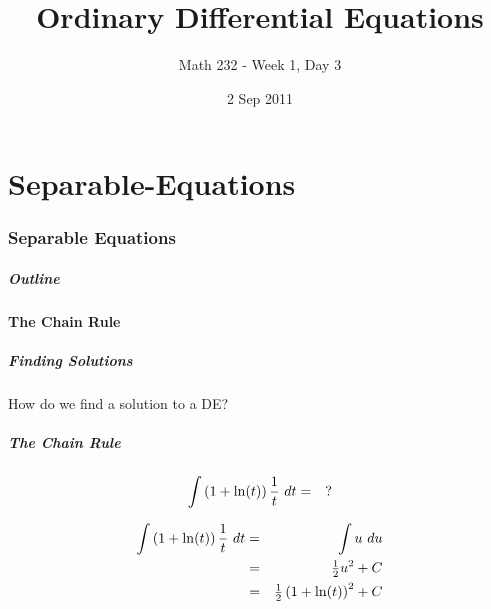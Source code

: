 \part{Separable-Equations}
\section{Separable Equations}


\title{Ordinary Differential Equations}
\subtitle{Math 232 - Week 1, Day 3}
\date{2 Sep 2011}

\begin{frame}
  \titlepage
\end{frame}

\begin{frame}
  \frametitle{Outline}
\end{frame}


\subsection{The Chain Rule}


\begin{frame}
  \frametitle{Finding Solutions}

  How do we find a solution to a DE?



\end{frame}


\begin{frame}
  \frametitle{The Chain Rule}

  \begin{eqnarray*}
    \int \left( 1 + \ln(t) \right) \frac{1}{t} ~ dt & = & ?
  \end{eqnarray*}


   {
    \begin{eqnarray*}
      \int \left( 1 + \ln(t) \right) \frac{1}{t} ~ dt & = & \int u ~ du \\
      & = & \mbox{$\frac{1}{2}$} u^2 + C \\
      & = & \mbox{$\frac{1}{2}$} \left( 1+\ln(t) \right)^2 + C
    \end{eqnarray*}
  }


\end{frame}

